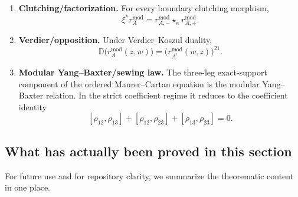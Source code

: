 \begin{definition}
\begin{enumerate}
\item[(P2)]
\textbf{Clutching/factorization.}
For every boundary clutching morphism,
\[
\xi^*r_A^{\mathrm{mod}}
=
r_{A,-}^{\mathrm{mod}}\star_\kappa r_{A,+}^{\mathrm{mod}}.
\]

\item[(P3)]
\textbf{Verdier/opposition.}
Under Verdier--Koszul duality,
\[
\mathbb D\bigl(r_A^{\mathrm{mod}}(z,w)\bigr)=\bigl(r_{A^!}^{\mathrm{mod}}(w,z)\bigr)^{21}.
\]

\item[(P4)]
\textbf{Modular Yang--Baxter/sewing law.}
The three-leg exact-support component of the ordered Maurer--Cartan equation is the modular
Yang--Baxter relation. In the strict coefficient regime it reduces to the coefficient identity
\[
[\rho_{12},\rho_{13}]
+
[\rho_{12},\rho_{23}]
+
[\rho_{13},\rho_{23}]
=
0.
\]
\end{enumerate}
\end{definition}

\subsection{What has actually been proved in this section}

For future use and for repository clarity, we summarize the theorematic content in one place.

